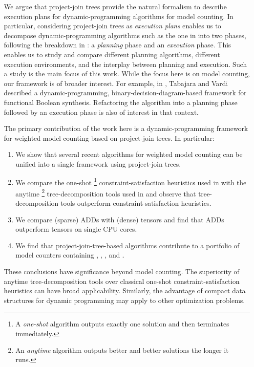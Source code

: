 We argue that project-join trees provide the natural formalism to describe execution plans for dynamic-programming algorithms for model counting.
In particular, considering project-join trees as \emph{execution plans} enables us to decompose dynamic-programming algorithms such as the one in \cite{dudek2020addmc} into two phases, following the breakdown in \cite{dudek2020parallel}: a \emph{planning} phase and an \emph{execution} phase.
This enables us to study and compare different planning algorithms, different execution environments, and the interplay between planning and execution.
Such a study is the main focus of this work.
While the focus here is on model counting, our framework is of broader interest.
For example, in \cite{tabajara2017factored}, Tabajara and Vardi described a dynamic-programming, binary-decision-diagram-based framework for functional Boolean synthesis.
Refactoring the algorithm into a planning phase followed by an execution phase is also of interest in that context.

The primary contribution of the work here is a dynamic-programming framework for weighted model counting based on project-join trees.
In particular:
\begin{enumerate}
    \item We show that several recent algorithms for weighted model counting \cite{dudek2020addmc,dudek2019efficient,fichte2020exploiting} can be unified into a single framework using project-join trees.
    \item We compare the one-shot%
    \footnote{A \emph{one-shot} algorithm outputs exactly one solution and then terminates immediately.}
    constraint-satisfaction heuristics used in \cite{dudek2020addmc} with the anytime%
    \footnote{An \emph{anytime} algorithm outputs better and better solutions the longer it runs.} tree-decomposition tools used in \cite{dudek2019efficient} and observe that
    tree-decomposition tools outperform
    constraint-satisfaction heuristics.
    \item We compare (sparse) ADDs \cite{bahar1997algebraic} with (dense) tensors \cite{kjolstad2017tensor} and find that ADDs outperform tensors on single CPU cores.
    \item We find that project-join-tree-based algorithms contribute to a portfolio of model counters containing \cachet{} \cite{sang2004combining}, \ctd{} \cite{darwiche2004new}, \df{} \cite{lagniez2017improved}, and \minictd{} \cite{oztok2015top}.
\end{enumerate}
These conclusions have significance beyond model counting.
The superiority of anytime tree-decomposition tools over classical one-shot constraint-satisfaction heuristics can have broad applicability.
Similarly, the advantage of compact data structures for dynamic programming may apply to other optimization problems.

